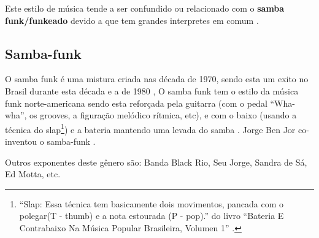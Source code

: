 Este estilo de música tende a ser confundido ou relacionado com o \textbf{samba funk/funkeado} 
devido a que tem grandes interpretes em comum \cite[pp. 36]{montanhaurbateria} \cite[pp. 131]{perna2002samba}.


\subsection{Samba-funk}
O samba funk é uma mistura criada nas década de 1970, 
sendo esta um exito no Brasil durante esta década e a de 1980
\cite[pp. 36]{montanhaurbateria} \cite[pp. 11]{medeiros2012brazilian}, 
O samba funk tem o estilo da música funk norte-americana 
sendo esta  reforçada pela guitarra 
(com o pedal ``Wha-wha'', os grooves, a figuração melódico rítmica, etc), e com
o baixo (usando a técnica do slap\footnote{``Slap: Essa técnica tem basicamente dois movimentos, 
pancada com o polegar(T - thumb) e a nota estourada (P - pop).'' do livro 
``Bateria E Contrabaixo Na Música Popular Brasileira, Volumen 1'' \cite[pp. 36]{montanhaurbateria}.}) 
e a bateria mantendo uma levada do samba \cite[pp. 11]{medeiros2012brazilian}.
Jorge Ben Jor co-inventou o samba-funk \cite[pp. 166]{sanches2000tropicalismo}.


Outros exponentes deste gênero são: 
Banda Black Rio,
Seu Jorge,
Sandra de Sá,
Ed Motta,
etc.


